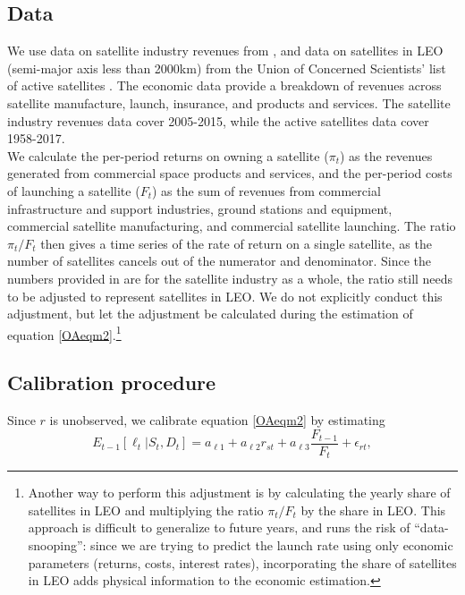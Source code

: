 \documentclass[12pt]{article}
\begin{document}
\subsection{Data}

We use data on satellite industry revenues from \citet{wienzierl2018}, and data on satellites in LEO (semi-major axis less than 2000km) from the Union of Concerned Scientists' list of active satellites \citep{UCSdata}. The economic data provide a breakdown of revenues across satellite manufacture, launch, insurance, and products and services. The satellite industry revenues data cover 2005-2015, while the active satellites data cover 1958-2017. \\

We calculate the per-period returns on owning a satellite ($\pi_t$) as the revenues generated from commercial space products and services, and the per-period costs of launching a satellite ($F_t$) as the sum of revenues from commercial infrastructure and support industries, ground stations and equipment, commercial satellite manufacturing, and commercial satellite launching. The ratio $\pi_t/F_t$ then gives a time series of the rate of return on a single satellite, as the number of satellites cancels out of the numerator and denominator. Since the numbers provided in \citet{wienzierl2018} are for the satellite industry as a whole, the ratio still needs to be adjusted to represent satellites in LEO. We do not explicitly conduct this adjustment, but let the adjustment be calculated during the estimation of equation \ref{OAeqm2}.\footnote{Another way to perform this adjustment is by calculating the yearly share of satellites in LEO and multiplying the ratio $\pi_t/F_t$ by the share in LEO. This approach is difficult to generalize to future years, and runs the risk of ``data-snooping'': since we are trying to predict the launch rate using only economic parameters (returns, costs, interest rates), incorporating the share of satellites in LEO adds physical information to the economic estimation.} \\ %

\subsection{Calibration procedure}

Since $r$ is unobserved, we calibrate equation \ref{OAeqm2} by estimating
\begin{equation}
\label{empiricalEqn}
E_{t-1}[\ell_t|S_t,D_t] = a_{\ell 1} + a_{\ell 2} r_{st} + a_{\ell 3} \frac{F_{t-1}}{F_t} + \epsilon_{r t},
\end{equation}
\end{document}
